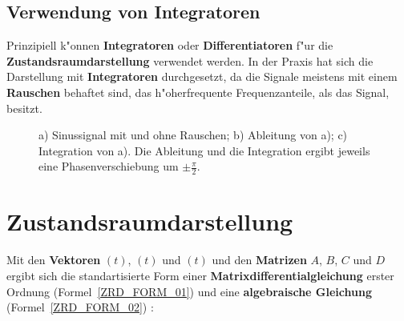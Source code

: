 \newpage
\subsection{Verwendung von Integratoren}
Prinzipiell k"onnen {\bf Integratoren} oder {\bf Differentiatoren} f"ur die {\bf Zustandsraumdarstellung} verwendet werden. In der Praxis hat sich die Darstellung mit {\bf Integratoren} durchgesetzt, da die Signale meistens mit einem {\bf Rauschen} behaftet sind, das h"oherfrequente Frequenzanteile, als das Signal, besitzt. 

\begin{figure}[!htb]
  \vspace*{-1mm}\begin{center}
    \vspace*{-3mm}\caption{a) Sinussignal mit und ohne Rauschen; b) Ableitung von a); c) Integration von a). Die Ableitung und die Integration ergibt jeweils eine Phasenverschiebung um $\pm \frac{\pi}{2}$.}
\end{center}
\vspace*{-6mm}
\end{figure}

\section{Zustandsraumdarstellung}
Mit den {\bf Vektoren} $(t)$, $(t)$ und $(t)$ und den {\bf Matrizen}  {\boldmath $A$, $B$, $C$} und  {\boldmath $D$} ergibt sich die standartisierte Form einer {\bf Matrixdifferentialgleichung} erster Ordnung (Formel~\ref{ZRD_FORM_01}) und eine {\bf algebraische Gleichung} (Formel~\ref{ZRD_FORM_02}) \cite{WEI:89}:\\~\\
\\~\\

